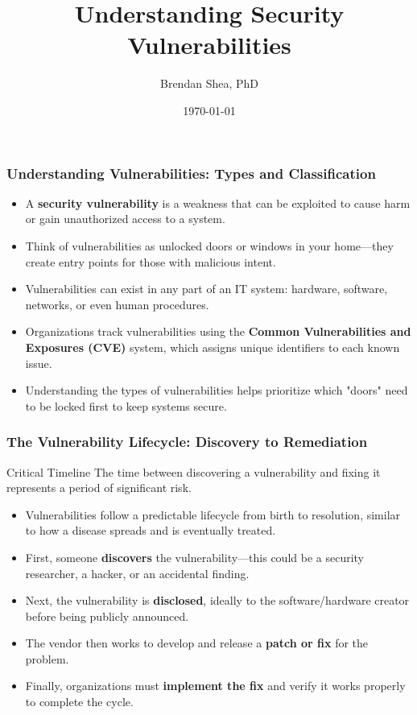 \documentclass{beamer}
\title{Understanding Security Vulnerabilities}
\author{Brendan Shea, PhD}
\date{\today}
\begin{document}
\begin{frame}
    \titlepage
\end{frame}

\begin{frame}
    \frametitle{Understanding Vulnerabilities: Types and Classification}
    
    \begin{itemize}
        \item A \textbf{security vulnerability} is a weakness that can be exploited to cause harm or gain unauthorized access to a system.
        \item Think of vulnerabilities as unlocked doors or windows in your home—they create entry points for those with malicious intent.
        \item Vulnerabilities can exist in any part of an IT system: hardware, software, networks, or even human procedures.
        \item Organizations track vulnerabilities using the \textbf{Common Vulnerabilities and Exposures (CVE)} system, which assigns unique identifiers to each known issue.
        \item Understanding the types of vulnerabilities helps prioritize which "doors" need to be locked first to keep systems secure.
    \end{itemize}
\end{frame}

\begin{frame}
    \frametitle{The Vulnerability Lifecycle: Discovery to Remediation}
    
    \begin{alertblock}{Critical Timeline}
        The time between discovering a vulnerability and fixing it represents a period of significant risk.
    \end{alertblock}
    
    \begin{itemize}
        \item Vulnerabilities follow a predictable lifecycle from birth to resolution, similar to how a disease spreads and is eventually treated.
        \item First, someone \textbf{discovers} the vulnerability—this could be a security researcher, a hacker, or an accidental finding.
        \item Next, the vulnerability is \textbf{disclosed}, ideally to the software/hardware creator before being publicly announced.
        \item The vendor then works to develop and release a \textbf{patch or fix} for the problem.
        \item Finally, organizations must \textbf{implement the fix} and verify it works properly to complete the cycle.
    \end{itemize}
\end{frame}
\end{document}
